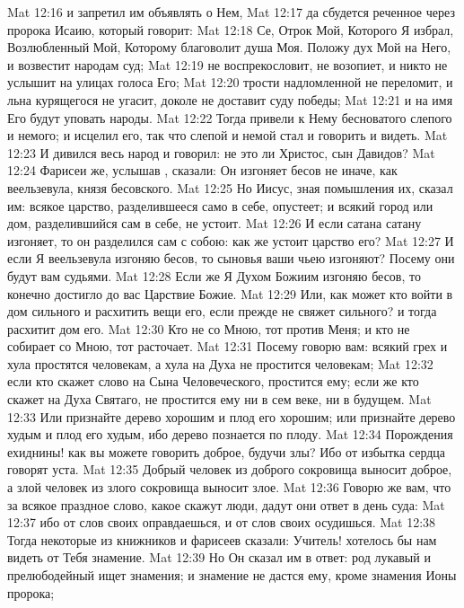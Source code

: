 \vs Mat 12:16 и запретил им объявлять о Нем,
\vs Mat 12:17 да сбудется реченное через пророка Исаию, который говорит:
\vs Mat 12:18 Се, Отрок Мой, Которого Я избрал, Возлюбленный Мой, Которому благоволит душа Моя. Положу дух Мой на Него, и возвестит народам суд;
\vs Mat 12:19 не воспрекословит, не возопиет, и никто не услышит на улицах голоса Его;
\vs Mat 12:20 трости надломленной не переломит, и льна курящегося не угасит, доколе не доставит суду победы;
\vs Mat 12:21 и на имя Его будут уповать народы.
\rsbpar\vs Mat 12:22 Тогда привели к Нему бесноватого слепого и немого; и исцелил его, так что слепой и немой стал и говорить и видеть.
\vs Mat 12:23 И дивился весь народ и говорил: не это ли Христос, сын Давидов?
\vs Mat 12:24 Фарисеи же, услышав , сказали: Он изгоняет бесов не иначе, как  веельзевула, князя бесовского.
\vs Mat 12:25 Но Иисус, зная помышления их, сказал им: всякое царство, разделившееся само в себе, опустеет; и всякий город или дом, разделившийся сам в себе, не устоит.
\vs Mat 12:26 И если сатана сатану изгоняет, то он разделился сам с собою: как же устоит царство его?
\vs Mat 12:27 И если Я  веельзевула изгоняю бесов, то сыновья ваши чьею  изгоняют? Посему они будут вам судьями.
\vs Mat 12:28 Если же Я Духом Божиим изгоняю бесов, то конечно достигло до вас Царствие Божие.
\vs Mat 12:29 Или, как может кто войти в дом сильного и расхитить вещи его, если прежде не свяжет сильного? и тогда расхитит дом его.
\vs Mat 12:30 Кто не со Мною, тот против Меня; и кто не собирает со Мною, тот расточает.
\vs Mat 12:31 Посему говорю вам: всякий грех и хула простятся человекам, а хула на Духа не простится человекам;
\vs Mat 12:32 если кто скажет слово на Сына Человеческого, простится ему; если же кто скажет на Духа Святаго, не простится ему ни в сем веке, ни в будущем.
\vs Mat 12:33 Или признайте дерево хорошим и плод его хорошим; или признайте дерево худым и плод его худым, ибо дерево познается по плоду.
\vs Mat 12:34 Порождения ехиднины! как вы можете говорить доброе, будучи злы? Ибо от избытка сердца говорят уста.
\vs Mat 12:35 Добрый человек из доброго сокровища выносит доброе, а злой человек из злого сокровища выносит злое.
\vs Mat 12:36 Говорю же вам, что за всякое праздное слово, какое скажут люди, дадут они ответ в день суда:
\vs Mat 12:37 ибо от слов своих оправдаешься, и от слов своих осудишься.
\rsbpar\vs Mat 12:38 Тогда некоторые из книжников и фарисеев сказали: Учитель! хотелось бы нам видеть от Тебя знамение.
\vs Mat 12:39 Но Он сказал им в ответ: род лукавый и прелюбодейный ищет знамения; и знамение не дастся ему, кроме знамения Ионы пророка;
